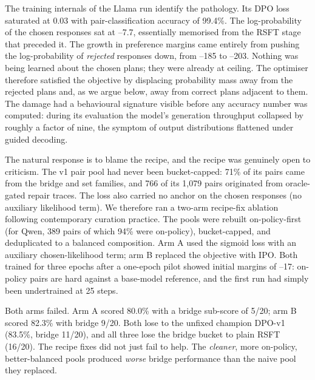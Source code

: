 \documentclass[10pt]{article} %
\begin{document}
The training internals of the Llama run identify the pathology. Its DPO loss saturated at 0.03 with pair-classification accuracy of 99.4\%. The log-probability of the chosen responses sat at --7.7, essentially memorised from the RSFT stage that preceded it. The growth in preference margins came entirely from pushing the log-probability of \emph{rejected} responses down, from --185 to --203. Nothing was being learned about the chosen plans; they were already at ceiling. The optimiser therefore satisfied the objective by displacing probability mass away from the rejected plans and, as we argue below, away from correct plans adjacent to them. The damage had a behavioural signature visible before any accuracy number was computed: during its evaluation the model's generation throughput collapsed by roughly a factor of nine, the symptom of output distributions flattened under guided decoding.

The natural response is to blame the recipe, and the recipe was genuinely open to criticism. The v1 pair pool had never been bucket-capped: 71\% of its pairs came from the bridge and set families, and 766 of its 1,079 pairs originated from oracle-gated repair traces. The loss also carried no anchor on the chosen responses (no auxiliary likelihood term). We therefore ran a two-arm recipe-fix ablation following contemporary curation practice. The pools were rebuilt on-policy-first (for Qwen, 389 pairs of which 94\% were on-policy), bucket-capped, and deduplicated to a balanced composition. Arm A used the sigmoid loss with an auxiliary chosen-likelihood term; arm B replaced the objective with IPO. Both trained for three epochs after a one-epoch pilot showed initial margins of --17: on-policy pairs are hard against a base-model reference, and the first run had simply been undertrained at 25 steps.

Both arms failed. Arm A scored 80.0\% with a bridge sub-score of 5/20; arm B scored 82.3\% with bridge 9/20. Both lose to the unfixed champion DPO-v1 (83.5\%, bridge 11/20), and all three lose the bridge bucket to plain RSFT (16/20). The recipe fixes did not just fail to help. The \emph{cleaner}, more on-policy, better-balanced pools produced \emph{worse} bridge performance than the naive pool they replaced.
\end{document}
